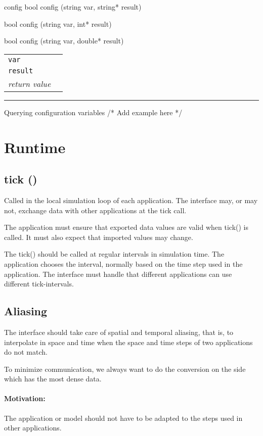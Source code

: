 \documentclass[a4paper]{report}
\makeatletter
\newenvironment{parameters}%
{\begin{tabular}{@{\hspace{2em}}lp{0.6\textwidth}}}%
{\end{tabular}\par\vspace{1mm}\par\hrule\par\vspace{5mm}}
\makeatother
\begin{document}
\begin{head}{config}
  bool config (string var, string* result)

  bool config (string var, int* result)

  bool config (string var, double* result)
\end{head}
\begin{parameters}
  \lstinline|var| & \\
  \lstinline|result| & \\
  \emph{return value} & \\
\end{parameters}

\begin{code}{Querying configuration variables}
  /* Add example here */
\end{code}

\section{Runtime}

\subsection{tick ()}

Called in the local simulation loop of each application.
The interface may, or may not, exchange data with other applications
at the tick call.

The application must ensure that exported data values are valid when
tick() is called.  It must also expect that imported values may change.

The tick() should be called at regular intervals in simulation time.
The application chooses the interval, normally based on the time step
used in the application.  The interface must handle that different
applications can use different tick-intervals.


\subsection{Aliasing}

The interface should take care of spatial and temporal aliasing, that
is, to interpolate in space and time when the space and time steps of
two applications do not match.

To minimize communication, we always want to do the conversion on the
side which has the most dense data.

\paragraph{Motivation:} The application or model should not have to be
adapted to the steps used in other applications.
\end{document}
